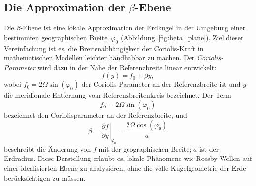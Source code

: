 \subsection{Die Approximation der \(\beta\)-Ebene }

Die \(\beta\)-Ebene ist eine lokale Approximation der Erdkugel in der Umgebung
einer bestimmten geographischen Breite~\(\varphi_0\)
(Abbildung~\ref{fig:beta_plane}). Ziel dieser Vereinfachung ist es, die
Breitenabhängigkeit der Coriolis-Kraft in mathematischen Modellen leichter
handhabbar zu machen. Der \emph{Coriolis-Parameter} wird dazu in der Nähe der
%
Referenzbreite linear entwickelt:
\begin{equation}
	f(y) = f_0 + \beta y,
	\label{rossby:eq:beta_plane}
\end{equation}
wobei $f_0 = 2 \Omega \sin(\varphi_0)$ der Coriolis-Parameter an der
Referenzbreite ist und $y$ die meridionale Entfernung vom
Referenzbreitenkreis bezeichnet.
Der Term
\begin{equation}
	f_0 = 2\Omega \sin(\varphi_0)
	\label{rossby:eq:coriolis_parameter_ref}
\end{equation}
bezeichnet den Coriolisparameter an der Referenzbreite, und
\begin{equation}
	\beta = \left.\frac{\partial f}{\partial y}\right|_{\varphi_0} = \frac{2\Omega \cos(\varphi_0)}{a}
	\label{rossby:eq:beta_parameter_ref}
\end{equation}
beschreibt die Änderung von $f$ mit der geographischen Breite; $a$ ist der
Erdradius. Diese Darstellung erlaubt es, lokale Phänomene wie Rossby-Wellen auf
einer idealisierten Ebene zu analysieren, ohne die volle Kugelgeometrie der
Erde berücksichtigen zu müssen.

